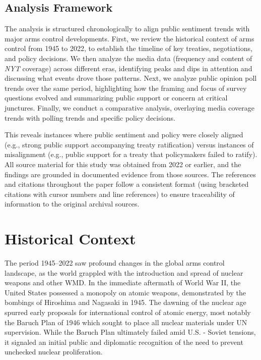 \documentclass[11,5 pt]{article}
\begin{document}
\subsection{Analysis Framework}

    The analysis is structured chronologically to align public sentiment trends with major arms control developments. First, we review the historical context of arms control from 1945 to 2022, to establish the timeline of key treaties, negotiations, and policy decisions. We then analyze the media data (frequency and content of \textit{NYT} coverage) across different eras, identifying peaks and dips in attention and discussing what events drove those patterns. Next, we analyze public opinion poll trends over the same period, highlighting how the framing and focus of survey questions evolved and summarizing public support or concern at critical junctures. Finally, we conduct a comparative analysis, overlaying media coverage trends with polling trends and specific policy decisions. 
    
    This reveals instances where public sentiment and policy were closely aligned (e.g., strong public support accompanying treaty ratification) versus instances of misalignment (e.g., public support for a treaty that policymakers failed to ratify). All source material for this study was obtained from 2022 or earlier, and the findings are grounded in documented evidence from those sources. The references and citations throughout the paper follow a consistent format (using bracketed citations with cursor numbers and line references) to ensure traceability of information to the original archival sources.


\section{Historical Context}
    
    The period 1945–2022 saw profound changes in the global arms control landscape, as the world grappled with the introduction and spread of nuclear weapons and other WMD. In the immediate aftermath of World War II, the United States possessed a monopoly on atomic weapons, demonstrated by the bombings of Hiroshima and Nagasaki in 1945. The dawning of the nuclear age spurred early proposals for international control of atomic energy, most notably the Baruch Plan of 1946 which sought to place all nuclear materials under UN supervision. While the Baruch Plan ultimately failed amid U.S. - Soviet tensions, it signaled an initial public and diplomatic recognition of the need to prevent unchecked nuclear proliferation. 
    
\end{document}
